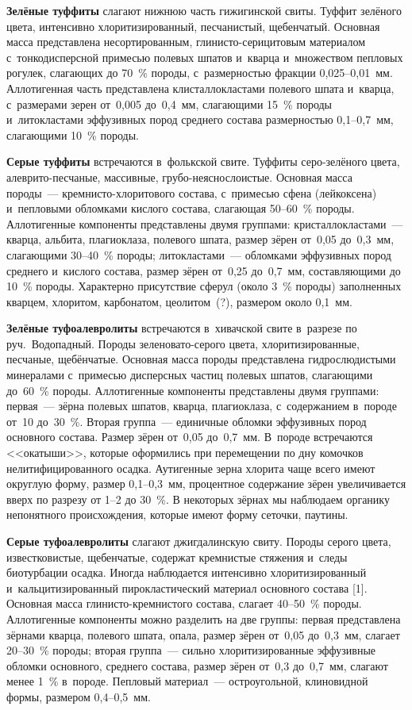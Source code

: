 \textbf{Зелёные туффиты} слагают нижнюю часть гижигинской свиты. Туффит зелёного цвета, интенсивно хлоритизированный, песчанистый, щебенчатый. Основная масса представлена несортированным, глинисто-серицитовым материалом с~тонкодисперсной примесью полевых шпатов и~кварца и~множеством пепловых рогулек, слагающих до 70~\% породы, с~размерностью фракции 0,025--0,01~мм. Аллотигенная часть представлена клисталлокластами полевого шпата и~кварца, с~размерами зерен от~0,005 до~0,4~мм, слагающими 15~\% породы и~литокластами эффузивных пород среднего состава размерностью 0,1--0,7~мм, слагающими 10~\% породы. \enlargethispage{2\baselineskip}

\textbf{Серые туффиты} встречаются в~фолькской свите. Туффиты серо-зелёного цвета, алеврито-песчаные, массивные, грубо-неяснослоистые. Основная масса породы~--- крем\-ни\-сто-хло\-ри\-то\-во\-го состава, с~примесью сфена (лейкоксена) и~пепловыми обломками кислого состава, слагающая 50--60~\% породы. Аллотигенные компоненты представлены двумя группами: кристаллокластами~--- кварца, альбита, плагиоклаза, полевого шпата, размер зёрен от~0,05 до~0,3~мм, слагающими 30--40~\% породы; литокластами~--- обломками эффузивных пород среднего и~кислого состава, размер зёрен от~0,25 до~0,7~мм, составляющими до 10~\% породы. Характерно присутствие сферул (около 3~\% породы) заполненных кварцем, хлоритом, карбонатом, цеолитом~(?), размером около 0,1~мм.


\textbf{Зелёные туфоалевролиты} встречаются в~хивачской свите в~разрезе по руч.~Водопадный. Породы зеленовато-серого цвета, хлоритизированные, песчаные, щебёнчатые. Основная масса породы представлена гидрослюдистыми минералами с~примесью дисперсных частиц полевых шпатов, слагающими до~60~\% породы. Аллотигенные компоненты представлены двумя группами: первая~--- зёрна полевых шпатов, кварца, плагиоклаза, с~содержанием в~породе от~10 до~30~\%. Вторая группа~--- единичные обломки эффузивных пород основного состава. Размер зёрен от~0,05 до~0,7~мм. В~породе встречаются <<окатыши>>, которые оформились при перемещении по дну комочков нелитифицированного осадка. Аутигенные зерна хлорита чаще всего имеют округлую форму, размер 0,1--0,3~мм, процентное содержание зёрен увеличивается вверх по разрезу от 1--2 до 30~\%. В некоторых зёрнах мы наблюдаем органику непонятного происхождения, которые имеют форму сеточки, паутины.

\textbf{Серые туфоалевролиты} слагают джигдалинскую свиту. Породы серого цвета, известковистые, щебенчатые, содержат кремнистые стяжения и~следы биотурбации осадка. Иногда наблюдается интенсивно хлоритизированный и~кальцитизированный пирокластический материал основного состава [1]. Основная масса глинисто-кремнистого состава, слагает 40--50~\% породы. Аллотигенные компоненты можно разделить на две группы: первая представлена зёрнами кварца, полевого шпата, опала, размер зёрен от~0,05 до~0,3~мм, слагает 20--30~\% породы; вторая группа~--- сильно хлоритизированные эффузивные обломки основного, среднего состава, размер зёрен от~0,3 до~0,7~мм, слагают менее 1~\% в~породе. Пепловый материал~--- остроугольной, клиновидной формы, размером 0,4--0,5~мм.

